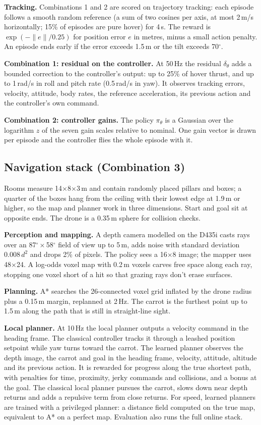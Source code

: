 \textbf{Tracking.} Combinations 1 and 2 are scored on trajectory tracking: each episode follows a smooth random reference (a sum of two cosines per axis, at most 2\,m/s horizontally; 15\% of episodes are pure hover) for 4\,s. The reward is $\exp(-\|e\|/0.25)$ for position error $e$ in metres, minus a small action penalty. An episode ends early if the error exceeds 1.5\,m or the tilt exceeds 70$^\circ$.

\textbf{Combination 1: residual on the controller.} At 50\,Hz the residual $\delta_\theta$ adds a bounded correction to the controller's output: up to 25\% of hover thrust, and up to 1\,rad/s in roll and pitch rate (0.5\,rad/s in yaw). It observes tracking errors, velocity, attitude, body rates, the reference acceleration, its previous action and the controller's own command.

\textbf{Combination 2: controller gains.} The policy $\pi_\theta$ is a Gaussian over the logarithm $z$ of the seven gain scales relative to nominal. One gain vector is drawn per episode and the controller flies the whole episode with it.

\subsection{Navigation stack (Combination 3)}
Rooms measure 14$\times$8$\times$3\,m and contain randomly placed pillars and boxes; a quarter of the boxes hang from the ceiling with their lowest edge at 1.9\,m or higher, so the map and planner work in three dimensions. Start and goal sit at opposite ends. The drone is a 0.35\,m sphere for collision checks.

\textbf{Perception and mapping.} A depth camera modelled on the D435i casts rays over an 87$^\circ\times$58$^\circ$ field of view up to 5\,m, adds noise with standard deviation $0.008\,d^2$ and drops 2\% of pixels. The policy sees a 16$\times$8 image; the mapper uses 48$\times$24. A log-odds voxel map with 0.2\,m voxels carves free space along each ray, stopping one voxel short of a hit so that grazing rays don't erase surfaces.

\textbf{Planning.} A* searches the 26-connected voxel grid inflated by the drone radius plus a 0.15\,m margin, replanned at 2\,Hz. The carrot is the furthest point up to 1.5\,m along the path that is still in straight-line sight.

\textbf{Local planner.} At 10\,Hz the local planner outputs a velocity command in the heading frame. The classical controller tracks it through a leashed position setpoint while yaw turns toward the carrot. The learned planner observes the depth image, the carrot and goal in the heading frame, velocity, attitude, altitude and its previous action. It is rewarded for progress along the true shortest path, with penalties for time, proximity, jerky commands and collisions, and a bonus at the goal. The classical local planner pursues the carrot, slows down near depth returns and adds a repulsive term from close returns. For speed, learned planners are trained with a privileged planner: a distance field computed on the true map, equivalent to A* on a perfect map. Evaluation also runs the full online stack.
